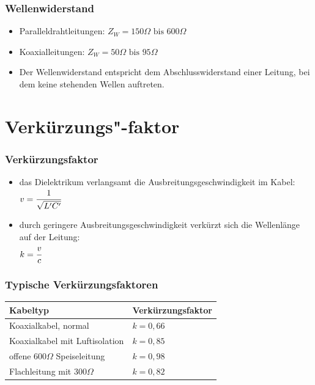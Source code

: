 \begin{frame}
  \frametitle{Wellenwiderstand}
  \begin{itemize}
      \begin{block}{Wellenwiderstand}
        $Z_W = \sqrt{\cfrac{L'}{C'}}$
      \end{block}
    \item Paralleldrahtleitungen: $Z_W = 150 \Omega \text{ bis } 600 \Omega$
    \item Koaxialleitungen: $Z_W = 50 \Omega \text{ bis } 95 \Omega$
    \item Der Wellenwiderstand entspricht dem Abschlusswiderstand einer Leitung, bei dem keine stehenden Wellen auftreten.
  \end{itemize}
\end{frame}

\section*{Verkürzungs"-faktor}
\begin{frame}
  \frametitle{Verkürzungsfaktor}
  \begin{itemize}
    \item das Dielektrikum verlangsamt die Ausbreitungsgeschwindigkeit im Kabel: \\
          $v = \cfrac{1}{\sqrt{L' C'}}$
    \item durch geringere Ausbreitungsgeschwindigkeit verkürzt sich die
          Wellenlänge auf der Leitung: \\ $k = \cfrac{v}{c}$
  \end{itemize}
\end{frame}

\begin{frame}
  \frametitle{Typische Verkürzungsfaktoren}
  \begin{center}
    \begin{tabular}{l|l}
      \textbf{Kabeltyp} & \textbf{Verkürzungsfaktor} \\ \hline
      Koaxialkabel, normal & $k = 0,66$ \\
      Koaxialkabel mit Luftisolation & $k = 0,85$ \\
      offene $600 \Omega$ Speiseleitung & $k = 0,98$ \\
      Flachleitung mit $300 \Omega$ & $k = 0,82$ \\
    \end{tabular}
  \end{center}
\end{frame}

